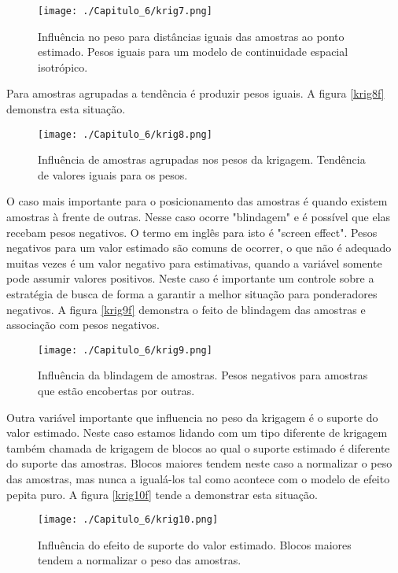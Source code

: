 \begin{figure}[H]
	\centering
	\texttt{[image: ./Capitulo\_6/krig7.png]}
	\caption{Influência no peso para distâncias iguais das amostras ao ponto estimado. Pesos iguais para um modelo de continuidade espacial isotrópico.}
	\label{krig7f}
\end{figure}

Para amostras agrupadas a tendência é produzir pesos iguais. A figura \eqref{krig8f} demonstra esta situação.

\begin{figure}[H]
	\centering
	\texttt{[image: ./Capitulo\_6/krig8.png]}
	\caption{Influência de amostras agrupadas nos pesos da krigagem. Tendência de valores iguais para os pesos. }
	\label{krig8f}
\end{figure}

O caso mais importante para o posicionamento das amostras é quando existem amostras à frente de outras. Nesse caso ocorre "blindagem" e é possível que elas recebam pesos negativos. O termo em inglês para isto é "screen effect". Pesos negativos para um valor estimado são comuns de ocorrer, o que não é adequado muitas vezes é um valor negativo para estimativas, quando a variável somente pode assumir valores positivos. Neste caso é importante um controle sobre a estratégia de busca de forma a garantir a melhor situação para ponderadores negativos. A figura \eqref{krig9f} demonstra o feito de blindagem das amostras e associação com pesos negativos. 

\begin{figure}[H]
	\centering
	\texttt{[image: ./Capitulo\_6/krig9.png]}
	\caption{Influência da blindagem de amostras. Pesos negativos para amostras que estão encobertas por outras. }
	\label{krig9f}
\end{figure}
 
Outra variável importante que influencia no peso da krigagem é o suporte do valor estimado. Neste caso estamos lidando com um tipo diferente de krigagem também chamada de krigagem de blocos ao qual o suporte estimado é diferente do suporte das amostras. Blocos maiores tendem neste caso a normalizar o peso das amostras, mas nunca a igualá-los tal como acontece com o modelo de efeito pepita puro. A figura \eqref{krig10f} tende a demonstrar esta situação. 

\begin{figure}[H]
	\centering
	\texttt{[image: ./Capitulo\_6/krig10.png]}
	\caption{Influência do efeito de suporte do valor estimado. Blocos maiores tendem a normalizar o peso das amostras.  }
	\label{krig10f}
\end{figure}


